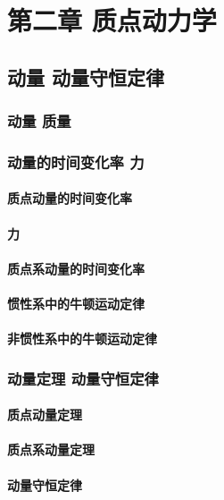 \chapter{第二章 质点动力学}

\section{动量 动量守恒定律}
    \subsection{动量 质量}
    \subsection{动量的时间变化率 力}
        \subsubsection{质点动量的时间变化率}
        \subsubsection{力}
        \subsubsection{质点系动量的时间变化率}
        \subsubsection{惯性系中的牛顿运动定律}
        \subsubsection{非惯性系中的牛顿运动定律}
    \subsection{动量定理 动量守恒定律}
        \subsubsection{质点动量定理}
        \subsubsection{质点系动量定理}
        \subsubsection{动量守恒定律}
